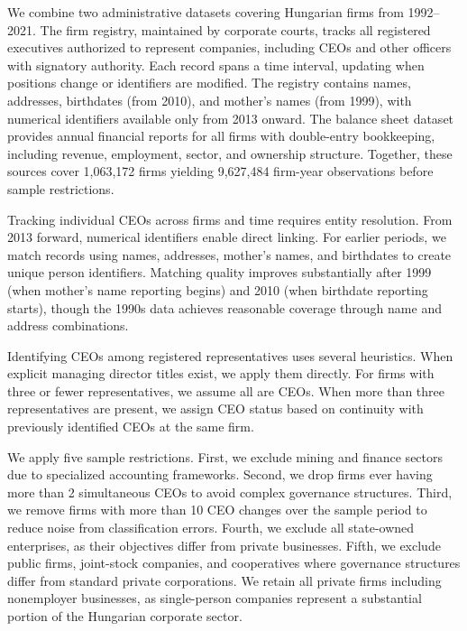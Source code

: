 \documentclass[9pt,twocolumn,twoside]{pnas-new}
\begin{document}
{%

We combine two administrative datasets covering Hungarian firms from 1992--2021. The firm registry, maintained by corporate courts, tracks all registered executives authorized to represent companies, including CEOs and other officers with signatory authority. Each record spans a time interval, updating when positions change or identifiers are modified. The registry contains names, addresses, birthdates (from 2010), and mother's names (from 1999), with numerical identifiers available only from 2013 onward. The balance sheet dataset provides annual financial reports for all firms with double-entry bookkeeping, including revenue, employment, sector, and ownership structure. Together, these sources cover 1,063,172 firms yielding 9,627,484 firm-year observations before sample restrictions.

Tracking individual CEOs across firms and time requires entity resolution. From 2013 forward, numerical identifiers enable direct linking. For earlier periods, we match records using names, addresses, mother's names, and birthdates to create unique person identifiers. Matching quality improves substantially after 1999 (when mother's name reporting begins) and 2010 (when birthdate reporting starts), though the 1990s data achieves reasonable coverage through name and address combinations.

Identifying CEOs among registered representatives uses several heuristics. When explicit managing director titles exist, we apply them directly. For firms with three or fewer representatives, we assume all are CEOs. When more than three representatives are present, we assign CEO status based on continuity with previously identified CEOs at the same firm.

We apply five sample restrictions. First, we exclude mining and finance sectors due to specialized accounting frameworks. Second, we drop firms ever having more than 2 simultaneous CEOs to avoid complex governance structures. Third, we remove firms with more than 10 CEO changes over the sample period to reduce noise from classification errors. Fourth, we exclude all state-owned enterprises, as their objectives differ from private businesses. Fifth, we exclude public firms, joint-stock companies, and cooperatives where governance structures differ from standard private corporations. We retain all private firms including nonemployer businesses, as single-person companies represent a substantial portion of the Hungarian corporate sector.

}
\end{document}
